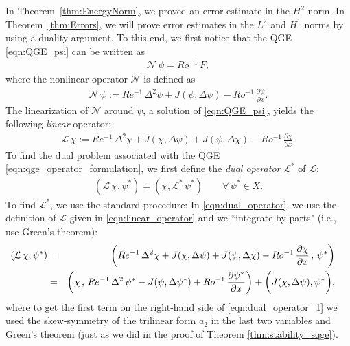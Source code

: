 In Theorem~\ref{thm:EnergyNorm}, we proved an error estimate in the $H^2$ norm.
In Theorem~\ref{thm:Errors}, we will prove error estimates in the $L^2$ and $H^1$ norms by using a duality argument.
To this end, we first notice that the QGE \eqref{eqn:QGE_psi} can be written as
\begin{eqnarray}
\mathcal{N} \, \psi
= Ro^{-1} \, F ,
\label{eqn:qge_operator_formulation}
\end{eqnarray}
where the nonlinear operator $\mathcal{N}$ is defined as
\begin{eqnarray}
\mathcal{N} \, \psi
:= Re^{-1} \, \Delta^2 \psi
+ J(\psi , \Delta \psi)
- Ro^{-1} \, \frac{\partial \psi}{\partial x} .
\label{eqn:nonlinear_operator}
\end{eqnarray}
The linearization of $\mathcal{N}$ around $\psi$, a solution of \eqref{eqn:QGE_psi}, yields the following \emph{linear} operator:
\begin{eqnarray}
\mathcal{L} \, \chi
:= Re^{-1} \, \Delta^2 \chi
+ J(\chi , \Delta \psi)
+ J(\psi, \Delta \chi)
- Ro^{-1} \, \frac{\partial \chi}{\partial x} .
\label{eqn:linear_operator}
\end{eqnarray}
To find the dual problem associated with the QGE \eqref{eqn:qge_operator_formulation}, we first define the \emph{dual operator} $\mathcal{L}^*$ of $\mathcal{L}$:
\begin{eqnarray}
(\mathcal{L} \, \chi , \psi^*)
= ( \chi , \mathcal{L}^* \, \psi^*)
\qquad
\forall \, \psi^* \in X .
\label{eqn:dual_operator}
\end{eqnarray}
To find $\mathcal{L}^*$, we use the standard procedure:
In \eqref{eqn:dual_operator}, we use the definition of $\mathcal{L}$ given in \eqref{eqn:linear_operator} and we ``integrate by parts" (i.e., use Green's theorem):
\begin{eqnarray}
\hspace*{-0.4cm}
(\mathcal{L} \, \chi , \psi^*)
&=& \left(
Re^{-1} \, \Delta^2 \chi
+ J(\chi , \Delta \psi)
+ J(\psi, \Delta \chi)
- Ro^{-1} \, \frac{\partial \chi}{\partial x}
\, , \, \psi^*
\right)
\nonumber \\
&=& \left(
\chi \, , \,
Re^{-1} \, \Delta^2 \, \psi^*
- J(\psi , \Delta \psi^* )
+ Ro^{-1} \, \frac{\partial \psi^*}{\partial x}
\right)
+ \biggl( J(\chi , \Delta \psi) , \psi^* \biggr) ,
\label{eqn:dual_operator_1}
\end{eqnarray}
where to get the first term on the right-hand side of \eqref{eqn:dual_operator_1} we used the skew-symmetry of the trilinear form $a_2$ in the last two variables and Green's theorem (just as we did in the proof of Theorem \ref{thm:stability_sqge}).
